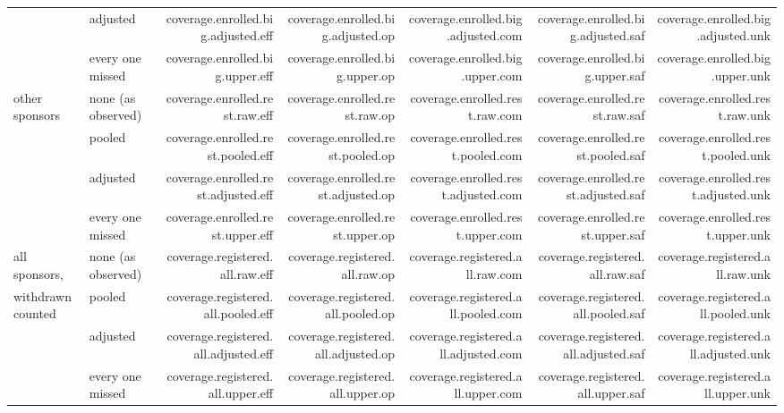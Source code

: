 \documentclass[11pt]{article}
\begin{document}
\begin{table}[H]
\begin{tabular}{llrrrrr}
 & adjusted & \num{coverage.enrolled.big.adjusted.eff} & \num{coverage.enrolled.big.adjusted.op} & \num{coverage.enrolled.big.adjusted.com} & \num{coverage.enrolled.big.adjusted.saf} & \num{coverage.enrolled.big.adjusted.unk} \\
 & every one missed & \num{coverage.enrolled.big.upper.eff} & \num{coverage.enrolled.big.upper.op} & \num{coverage.enrolled.big.upper.com} & \num{coverage.enrolled.big.upper.saf} & \num{coverage.enrolled.big.upper.unk} \\
\midrule
other sponsors & none (as observed) & \num{coverage.enrolled.rest.raw.eff} & \num{coverage.enrolled.rest.raw.op} & \num{coverage.enrolled.rest.raw.com} & \num{coverage.enrolled.rest.raw.saf} & \num{coverage.enrolled.rest.raw.unk} \\
 & pooled & \num{coverage.enrolled.rest.pooled.eff} & \num{coverage.enrolled.rest.pooled.op} & \num{coverage.enrolled.rest.pooled.com} & \num{coverage.enrolled.rest.pooled.saf} & \num{coverage.enrolled.rest.pooled.unk} \\
 & adjusted & \num{coverage.enrolled.rest.adjusted.eff} & \num{coverage.enrolled.rest.adjusted.op} & \num{coverage.enrolled.rest.adjusted.com} & \num{coverage.enrolled.rest.adjusted.saf} & \num{coverage.enrolled.rest.adjusted.unk} \\
 & every one missed & \num{coverage.enrolled.rest.upper.eff} & \num{coverage.enrolled.rest.upper.op} & \num{coverage.enrolled.rest.upper.com} & \num{coverage.enrolled.rest.upper.saf} & \num{coverage.enrolled.rest.upper.unk} \\
\midrule
all sponsors, & none (as observed) & \num{coverage.registered.all.raw.eff} & \num{coverage.registered.all.raw.op} & \num{coverage.registered.all.raw.com} & \num{coverage.registered.all.raw.saf} & \num{coverage.registered.all.raw.unk} \\
withdrawn counted & pooled & \num{coverage.registered.all.pooled.eff} & \num{coverage.registered.all.pooled.op} & \num{coverage.registered.all.pooled.com} & \num{coverage.registered.all.pooled.saf} & \num{coverage.registered.all.pooled.unk} \\
 & adjusted & \num{coverage.registered.all.adjusted.eff} & \num{coverage.registered.all.adjusted.op} & \num{coverage.registered.all.adjusted.com} & \num{coverage.registered.all.adjusted.saf} & \num{coverage.registered.all.adjusted.unk} \\
 & every one missed & \num{coverage.registered.all.upper.eff} & \num{coverage.registered.all.upper.op} & \num{coverage.registered.all.upper.com} & \num{coverage.registered.all.upper.saf} & \num{coverage.registered.all.upper.unk} \\
\bottomrule
\end{tabular}
\end{table}
\end{document}
